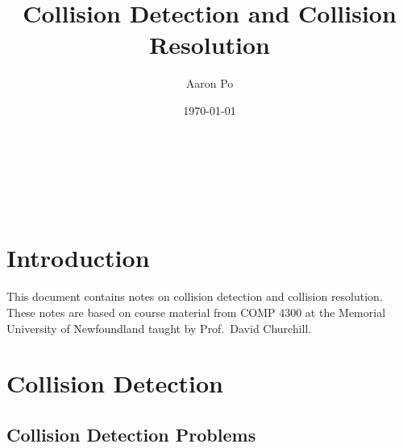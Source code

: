 \documentclass{article}
\author{Aaron Po}
\title{Collision Detection and Collision Resolution}
\date{\today}
\makeatletter
\renewcommand\maketitle{
    \begin{center}
        {\textbf{\LARGE{\@title}}} \\
        \vspace{1em}
        {\textbf{\Large{\@author}}} \\
        \vspace{1em}
        {\textbf{\large{\@date}}} \\
        \vspace{2em}
    \end{center}
}
\makeatother
\begin{document}
\maketitle

\section{Introduction}
This document contains notes on collision detection and collision resolution.
These notes are based on course material from COMP 4300 at the Memorial
University of Newfoundland taught by Prof.\ David Churchill.

\section{Collision Detection}
\subsection{Collision Detection Problems}
\end{document}
